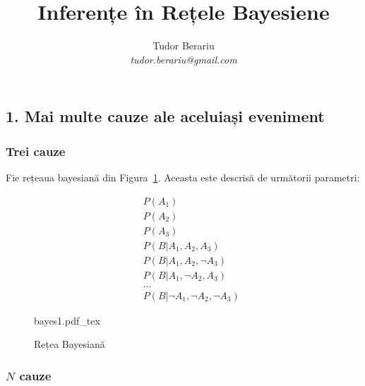 \documentclass[12pt]{article}
\title{Inferențe în Rețele Bayesiene}
\author{Tudor Berariu \\ \emph{tudor.berariu@gmail.com}}
\begin{document}
\maketitle

\subsection*{1. Mai multe cauze ale aceluiași eveniment}
\label{mc}

\subsubsection*{Trei cauze}
\label{sec:trei}

Fie rețeaua bayesiană din Figura~\ref{fig:bayes1}. Aceasta este
descrisă de următorii parametri:
\begin{multicol}{2}
  \begin{eqnarray*}
    & & P(A_1) \\
    & & P(A_2) \\
    & & P(A_3) \\
    & & P(B \vert A_1, A_2, A_3) \\
    & & P(B \vert A_1, A_2, \neg A_3) \\
    & & P(B \vert A_1, \neg A_2, A_3) \\
    & & \ldots \\
    & & P(B \vert \neg A_1, \neg A_2, \neg A_3)
  \end{eqnarray*}
  \begin{figure}[h]
    \centering
    \def\svgwidth{8cm}
    {bayes1.pdf_tex}
    \caption{Rețea Bayesiană}
    \label{fig:bayes1}
  \end{figure}
\end{multicol}



\subsubsection*{$N$ cauze}
\label{sec:n}
\end{document}
